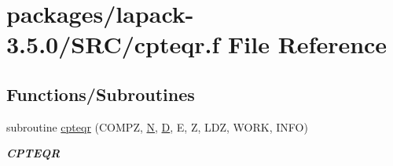 \hypertarget{cpteqr_8f}{}\section{packages/lapack-\/3.5.0/\+S\+R\+C/cpteqr.f File Reference}
\label{cpteqr_8f}
\subsection*{Functions/\+Subroutines}
\begin{DoxyCompactItemize}
\item 
subroutine \hyperlink{group__complexPTcomputational_ga0333b0f77b9e0af4ad1012b14d9d9d22}{cpteqr} (C\+O\+M\+P\+Z, \hyperlink{polmisc_8c_a0240ac851181b84ac374872dc5434ee4}{N}, \hyperlink{odrpack_8h_a7dae6ea403d00f3687f24a874e67d139}{D}, E, Z, L\+D\+Z, W\+O\+R\+K, I\+N\+F\+O)
\begin{DoxyCompactList}\small\item\em {\bfseries C\+P\+T\+E\+Q\+R} \end{DoxyCompactList}\end{DoxyCompactItemize}
